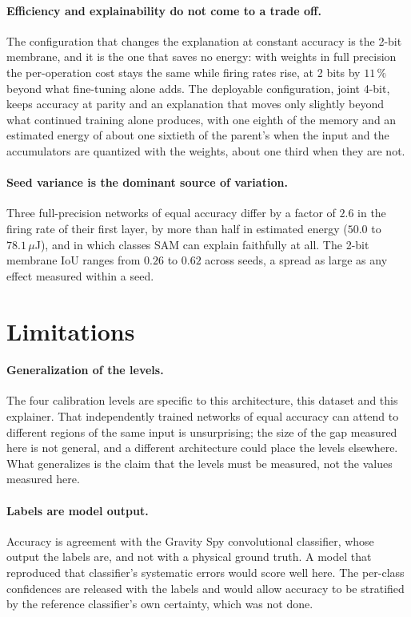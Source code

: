 \paragraph{Efficiency and explainability do not come to a trade off.} The
configuration that changes the explanation at constant accuracy is the
2-bit membrane, and it is the one that saves no energy: with weights in full
precision the per-operation cost stays the same while firing rates rise, at 2
bits by $11\,\%$ beyond what fine-tuning alone adds. The deployable
configuration, joint 4-bit, keeps accuracy at parity and an explanation that
moves only slightly beyond what continued training alone produces, with one
eighth of the memory and an estimated energy of about one sixtieth of the
parent's when the input and the accumulators are quantized with the weights,
about one third when they are not.

\paragraph{Seed variance is the dominant source of variation.} Three
full-precision networks of equal accuracy differ by a factor of $2.6$ in the
firing rate of their first layer, by more than half in estimated energy ($50.0$
to $78.1\,\mu$J), and in which classes SAM can explain faithfully at all. The
2-bit membrane IoU ranges from $0.26$ to $0.62$ across seeds, a spread as large
as any effect measured within a seed.

\section{Limitations}

\paragraph{Generalization of the levels.} The four calibration levels are
specific to this architecture, this dataset and this explainer. That
independently trained networks of equal accuracy can attend to different regions
of the same input is unsurprising; the size of the gap measured here is not
general, and a different architecture could place the levels elsewhere. What
generalizes is the claim that the levels must be measured, not the values
measured here.

\paragraph{Labels are model output.} Accuracy is agreement with the Gravity Spy
convolutional classifier, whose output the labels are, and not with a physical
ground truth. A model that reproduced that classifier's systematic errors would
score well here. The per-class confidences are released with the labels and
would allow accuracy to be stratified by the reference classifier's own
certainty, which was not done.

